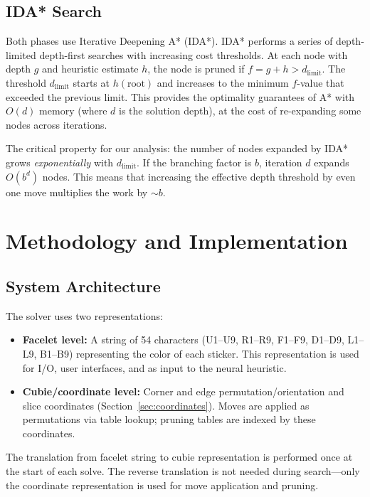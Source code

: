 \documentclass[10pt,twocolumn,a4paper]{article}
\begin{document}
\subsection{IDA* Search}
\label{sec:ida-star}
Both phases use Iterative Deepening A* (IDA*). IDA* performs a series of depth-limited depth-first searches with increasing cost thresholds. At each node with depth $g$ and heuristic estimate $h$, the node is pruned if $f = g + h > d_{\text{limit}}$. The threshold $d_{\text{limit}}$ starts at $h(\text{root})$ and increases to the minimum $f$-value that exceeded the previous limit. This provides the optimality guarantees of A* with $O(d)$ memory (where $d$ is the solution depth), at the cost of re-expanding some nodes across iterations.

The critical property for our analysis: the number of nodes expanded by IDA* grows \emph{exponentially} with $d_{\text{limit}}$. If the branching factor is $b$, iteration $d$ expands $O(b^d)$ nodes. This means that increasing the effective depth threshold by even one move multiplies the work by $\sim b$.

\section{Methodology and Implementation}
\label{sec:method}

\subsection{System Architecture}
The solver uses two representations:
\begin{itemize}[leftmargin=*]
  \item \textbf{Facelet level:} A string of 54 characters (U1--U9, R1--R9, F1--F9, D1--D9, L1--L9, B1--B9) representing the color of each sticker. This representation is used for I/O, user interfaces, and as input to the neural heuristic.
  \item \textbf{Cubie/coordinate level:} Corner and edge permutation/orientation and slice coordinates (Section~\ref{sec:coordinates}). Moves are applied as permutations via table lookup; pruning tables are indexed by these coordinates.
\end{itemize}

The translation from facelet string to cubie representation is performed once at the start of each solve. The reverse translation is not needed during search---only the coordinate representation is used for move application and pruning.
\end{document}
